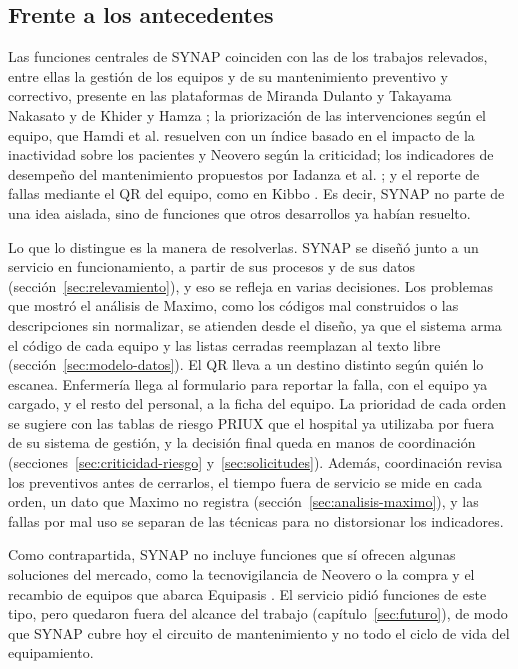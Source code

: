 \documentclass[10pt]{article}
\begin{document}
\subsection{Frente a los antecedentes}
\label{sec:frente-antecedentes}

Las funciones centrales de SYNAP coinciden con las de los trabajos relevados, entre ellas la gestión de los equipos y de su mantenimiento preventivo y correctivo, presente en las plataformas de Miranda Dulanto y Takayama Nakasato \cite{miranda_takayama2017} y de Khider y Hamza \cite{khider_hamza2023}; la priorización de las intervenciones según el equipo, que Hamdi et al. \cite{hamdi2012} resuelven con un índice basado en el impacto de la inactividad sobre los pacientes y Neovero \cite{neovero} según la criticidad; los indicadores de desempeño del mantenimiento propuestos por Iadanza et al. \cite{iadanza2019}; y el reporte de fallas mediante el QR del equipo, como en Kibbo \cite{leex_medical}. Es decir, SYNAP no parte de una idea aislada, sino de funciones que otros desarrollos ya habían resuelto.

Lo que lo distingue es la manera de resolverlas. SYNAP se diseñó junto a un servicio en funcionamiento, a partir de sus procesos y de sus datos (sección~\ref{sec:relevamiento}), y eso se refleja en varias decisiones. Los problemas que mostró el análisis de Maximo, como los códigos mal construidos o las descripciones sin normalizar, se atienden desde el diseño, ya que el sistema arma el código de cada equipo y las listas cerradas reemplazan al texto libre (sección~\ref{sec:modelo-datos}). El QR lleva a un destino distinto según quién lo escanea. Enfermería llega al formulario para reportar la falla, con el equipo ya cargado, y el resto del personal, a la ficha del equipo. La prioridad de cada orden se sugiere con las tablas de riesgo PRIUX que el hospital ya utilizaba por fuera de su sistema de gestión, y la decisión final queda en manos de coordinación (secciones~\ref{sec:criticidad-riesgo} y~\ref{sec:solicitudes}). Además, coordinación revisa los preventivos antes de cerrarlos, el tiempo fuera de servicio se mide en cada orden, un dato que Maximo no registra (sección~\ref{sec:analisis-maximo}), y las fallas por mal uso se separan de las técnicas para no distorsionar los indicadores.

Como contrapartida, SYNAP no incluye funciones que sí ofrecen algunas soluciones del mercado, como la tecnovigilancia de Neovero \cite{neovero} o la compra y el recambio de equipos que abarca Equipasis \cite{equipasis}. El servicio pidió funciones de este tipo, pero quedaron fuera del alcance del trabajo (capítulo~\ref{sec:futuro}), de modo que SYNAP cubre hoy el circuito de mantenimiento y no todo el ciclo de vida del equipamiento.
\end{document}
